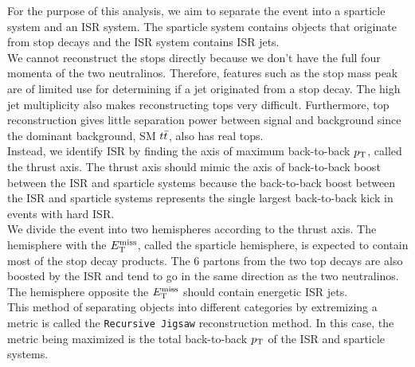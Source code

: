 \indent  For the purpose of this analysis, we aim to separate the event into a sparticle system and an ISR system.  The sparticle system contains objects that originate from stop decays and the ISR system contains ISR jets. \\

\indent We cannot reconstruct the stops directly because we don't have the full four momenta of the two neutralinos.  Therefore, features such as the stop mass peak are of limited use for determining if a jet originated from a stop decay. The high jet multiplicity also makes reconstructing tops very difficult.  Furthermore, top reconstruction gives little separation power between signal and background since the dominant background, SM $t\bar{t}$, also has real tops. \\

\indent Instead, we identify ISR by finding the axis of maximum back-to-back $p_{\mathrm{T}}$, called the thrust axis.  The thrust axis should mimic the axis of back-to-back boost between the ISR and sparticle systems because the back-to-back boost between the ISR and sparticle systems represents the single largest back-to-back kick in events with hard ISR. \\


\indent We divide the event into two hemispheres according to the thrust axis.  The hemisphere with the $E_{\mathrm{T}}^{\mathrm{miss}}$, called the sparticle hemisphere, is expected to contain most of the stop decay products.  The 6 partons from the two top decays are also boosted by the ISR and tend to go in the same direction as the two neutralinos. The hemisphere opposite the $E_{\mathrm{T}}^{\mathrm{miss}}$ should contain energetic ISR jets. \\

\indent This method of separating objects into different categories by extremizing a metric is called the {\tt Recursive Jigsaw} reconstruction method.\cite{JigsawCompressed,JigsawContraBoost}   In this case, the metric being maximized is the total back-to-back $p_{\mathrm{T}}$ of the ISR and sparticle systems.  \\

